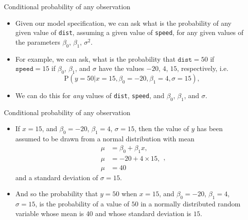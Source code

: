 \documentclass[
  10pt,
  ignorenonframetext,
]{beamer}
\providecommand{\tightlist}{%
  \setlength{\itemsep}{0pt}\setlength{\parskip}{0pt}}
\newcommand{\Prob}[1]{\mathrm{P}( #1 )}
\newcommand*{\given}{\vert}
\begin{document}
\begin{frame}[fragile]{Conditional probability of any observation}
\protect\hypertarget{conditional-probability-of-any-observation}{}
\begin{itemize}
\tightlist
\item
  Given our model specification, we can ask what is the probability of
  any given value of \texttt{dist}, assuming a given value of
  \texttt{speed}, for any given values of the parameters \(\beta_0\),
  \(\beta_1\), \(\sigma^2\).
\item
  For example, we can ask, what is the probability that
  \(\texttt{dist} = 50\) if \(\texttt{speed} = 15\) if \(\beta_0\),
  \(\beta_1\), and \(\sigma\) have the values \(-20\), \(4\), \(15\),
  respectively, i.e.~ \[
  \Prob{y = 50 \given x = 15, \beta_0 = -20, \beta_1 = 4, \sigma = 15},
  \]
\item
  We can do this for \emph{any} values of \texttt{dist}, \texttt{speed},
  and \(\beta_0\), \(\beta_1\), and \(\sigma\).
\end{itemize}
\end{frame}

\begin{frame}{Conditional probability of any observation}
\protect\hypertarget{conditional-probability-of-any-observation-1}{}
\begin{itemize}
\item
  If \(x = 15\), and \(\beta_0 = -20\), \(\beta_1 = 4\),
  \(\sigma = 15\), then the value of \(y\) has been assumed to be drawn
  from a normal distribution with mean \[
  \begin{aligned}
  \mu &= \beta_0 + \beta_1 x,\\
  \mu &= -20 + 4 \times 15,\\
  \mu &= 40
  \end{aligned},
  \] and a standard deviation of \(\sigma = 15\).
\item
  And so the probability that \(y = 50\) when \(x = 15\), and
  \(\beta_0 = -20\), \(\beta_1 = 4\), \(\sigma = 15\), is the
  probability of a value of \(50\) in a normally distributed random
  variable whose mean is 40 and whose standard deviation is \(15\).
\end{itemize}
\end{frame}
\end{document}
